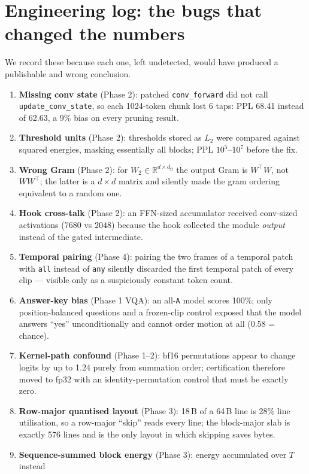 \documentclass[11pt]{article}
\newcommand{\dff}{\ensuremath{d_{\mathrm{ff}}}}
\newcommand{\code}[1]{\texttt{\small #1}}
\begin{document}
\section{Engineering log: the bugs that changed the numbers}
We record these because each one, left undetected, would have produced a publishable and
wrong conclusion.
\begin{enumerate}
\item \textbf{Missing conv state} (Phase 2): patched \code{conv\_forward} did not call
\code{update\_conv\_state}, so each 1024-token chunk lost 6 taps: PPL 68.41 instead of
62.63, a 9\% bias on every pruning result.
\item \textbf{Threshold units} (Phase 2): thresholds stored as $L_2$ were compared against
squared energies, masking essentially all blocks; PPL $10^{5}$--$10^{7}$ before the fix.
\item \textbf{Wrong Gram} (Phase 2): for $W_2\in\mathbb{R}^{d\times\dff}$ the output Gram is
$W^{\!\top}W$, not $WW^{\!\top}$; the latter is a $d\times d$ matrix and silently made the
gram ordering equivalent to a random one.
\item \textbf{Hook cross-talk} (Phase 2): an FFN-sized accumulator received conv-sized
activations ($7680$ vs $2048$) because the hook collected the module \emph{output} instead
of the gated intermediate.
\item \textbf{Temporal pairing} (Phase 4): pairing the two frames of a temporal patch with
\code{all} instead of \code{any} silently discarded the first temporal patch of every clip
--- visible only as a suspiciously constant token count.
\item \textbf{Answer-key bias} (Phase 1 VQA): an all-\code{A} model scores 100\%; only
position-balanced questions and a frozen-clip control exposed that the model answers
``yes'' unconditionally and cannot order motion at all (0.58 = chance).
\item \textbf{Kernel-path confound} (Phase 1--2): bf16 permutations appear to change logits
by up to 1.24 purely from summation order; certification therefore moved to fp32 with an
identity-permutation control that must be exactly zero.
\item \textbf{Row-major quantised layout} (Phase 3): 18\,B of a 64\,B line is 28\% line
utilisation, so a row-major ``skip'' reads every line; the block-major slab is exactly 576
lines and is the only layout in which skipping saves bytes.
\item \textbf{Sequence-summed block energy} (Phase 3): energy accumulated over $T$ instead

\end{enumerate}
\end{document}
